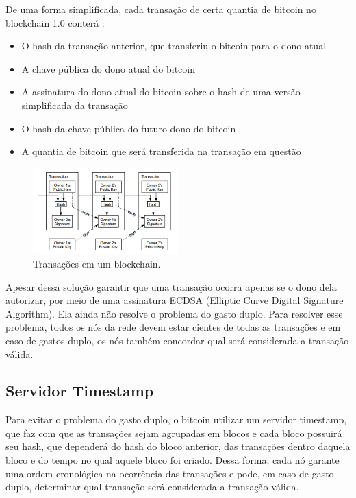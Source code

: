 De uma forma simplificada, cada transação de certa quantia de bitcoin no blockchain 1.0 conterá \cite{bitcoin_transaction}:

\begin{itemize}
\item O hash da transação anterior, que transferiu o bitcoin para o dono atual
\item A chave pública do dono atual do bitcoin
\item A assinatura do dono atual do bitcoin sobre o hash de uma versão simplificada da transação
\item O hash da chave pública do futuro dono do bitcoin
\item A quantia de bitcoin que será transferida na transação em questão
\end{itemize}

\begin{figure}[ht]
\centering
\includegraphics[width=0.5\textwidth]{Cap1/blockchain_transactions}
\caption{Transações em um blockchain.}
\label{blockchain_transactions}
\end{figure}

Apesar dessa solução garantir que uma transação ocorra apenas se o dono dela autorizar, por meio de uma assinatura ECDSA (Elliptic Curve Digital Signature Algorithm). Ela ainda não resolve o problema do gasto duplo. Para resolver esse problema, todos os nós da rede devem estar cientes de todas as transações e em caso de gastos duplo, os nós também concordar qual será considerada a transação válida.

\subsection{Servidor Timestamp}

Para evitar o problema do gasto duplo, o bitcoin utilizar um servidor timestamp, que faz com que as transações sejam agrupadas em blocos e cada bloco possuirá seu hash, que dependerá do hash do bloco anterior, das transações dentro daquela bloco e do tempo no qual aquele bloco foi criado. Dessa forma, cada nó garante uma ordem cronológica na ocorrência das transações e pode, em caso de gasto duplo, determinar qual transação será considerada a transação válida.

